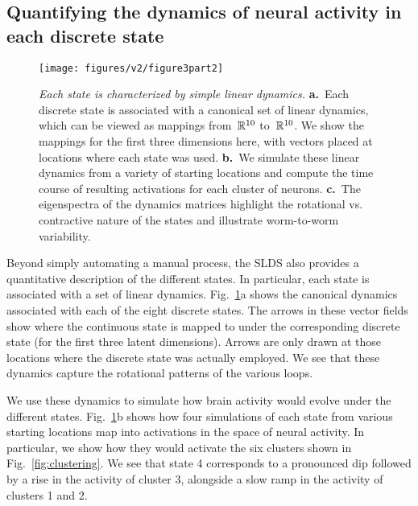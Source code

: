 \documentclass[11pt]{article}
\begin{document}
\subsection*{Quantifying the dynamics of neural activity in each discrete state}
\begin{figure}[h!]
\centering
\texttt{[image: figures/v2/figure3part2]} 
\caption{ \textit{Each state is characterized by simple linear dynamics.}
    \textbf{a.}~Each discrete state is associated with a canonical set of linear
  dynamics, which can be viewed as mappings from~$\mathbb{R}^{10}$ to~$\mathbb{R}^{10}$.
  We show the mappings for the first three dimensions here, with vectors placed
  at locations where each state was used.
  \textbf{b.}~We simulate these linear dynamics from a variety of starting
  locations and compute the time course of resulting activations for each
  cluster of neurons.
  \textbf{c.}~The eigenspectra of the dynamics matrices highlight the rotational
  vs. contractive nature of the states and illustrate worm-to-worm variability. 
}
\label{fig:dynamics}
\end{figure}

Beyond simply automating a manual process, the SLDS also provides a
quantitative description of the different states.  In particular, each
state is associated with a set of linear dynamics.
Fig.~\ref{fig:dynamics}a shows the canonical dynamics associated with
each of the eight discrete states. The arrows in these vector fields
show where the continuous state is mapped to under the corresponding
discrete state (for the first three latent dimensions).  Arrows are
only drawn at those locations where the discrete state was actually
employed.  We see that these dynamics capture the rotational patterns
of the various loops.

We use these dynamics to simulate how brain activity would evolve
under the different states. Fig.~\ref{fig:dynamics}b shows how four
simulations of each state from various starting locations  map 
into activations in the space of neural activity. In particular, we show how they would
activate the six clusters shown in Fig.~\ref{fig:clustering}.  We see
that state 4 corresponds to a pronounced dip followed by a rise in the
activity of cluster 3, alongside a slow ramp in the activity of
clusters 1 and 2.
\end{document}

